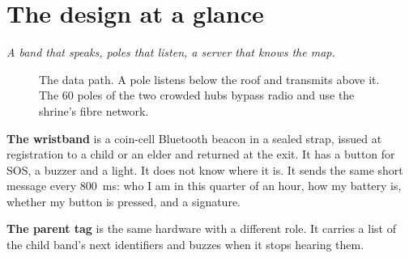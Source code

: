 \documentclass[11pt,a4paper,twoside,openany]{book}
\newcommand{\hook}[1]{{\noindent\fontsize{13}{19}\selectfont\itshape\color{rsmuted}#1\par}\vspace{12pt}}
\begin{document}
\chapter{The design at a glance}\label{ch:design}
\hook{A band that speaks, poles that listen, a server that knows the map.}
\begin{figure}[htb]\centering
{}
\caption{The data path. A pole listens below the roof and transmits above it. The 60 poles of the two crowded hubs
bypass radio and use the shrine's fibre network.}\label{fig:path}\end{figure}

\textbf{The wristband} is a coin-cell Bluetooth beacon in a sealed strap, issued at registration to a child or an
elder and returned at the exit. It has a button for SOS, a buzzer and a light. It does not know where it is. It sends
the same short message every 800~ms: who I am in this quarter of an hour, how my battery is, whether my button is
pressed, and a signature.

\textbf{The parent tag} is the same hardware with a different role. It carries a list of the child band's next
identifiers and buzzes when it stops hearing them.
\end{document}
